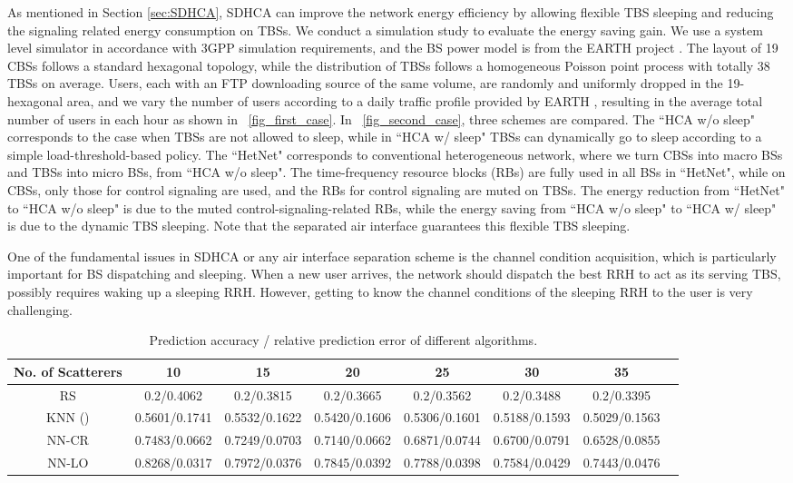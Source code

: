 \documentclass[12pt, draftclsnofoot,onecolumn]{IEEEtran}
\begin{document}
As mentioned in Section \ref{sec:SDHCA}, SDHCA can improve the network energy efficiency by allowing flexible TBS sleeping and reducing the signaling related energy consumption on TBSs. We
conduct a simulation study to evaluate the energy saving gain.  We use a system level simulator in accordance with
3GPP simulation requirements, and the BS power model is from the EARTH project
\cite{Earth}. The layout of 19 CBSs follows a standard hexagonal topology, while
the distribution of TBSs follows a homogeneous Poisson point process with
totally 38 TBSs on average. Users, each with an FTP downloading source of the same volume, are randomly and uniformly dropped in the 19-hexagonal area, and we vary the number of users according to a daily traffic
profile provided by EARTH \cite{Earth}, resulting in the average total number of users in
each hour as shown in \figurename~\ref{fig_first_case}. In \figurename~\ref{fig_second_case}, three schemes are compared. The ``HCA w/o sleep" corresponds to the case when TBSs are not allowed to sleep, while in ``HCA w/ sleep" TBSs can dynamically go to sleep according to a simple load-threshold-based policy. The ``HetNet" corresponds to conventional heterogeneous network, where we turn CBSs into macro BSs and TBSs into micro BSs, from ``HCA w/o sleep". The time-frequency resource blocks (RBs) are fully used in all BSs in ``HetNet", while on CBSs, only those for control signaling are used, and the RBs for control signaling are muted on TBSs. The energy reduction from ``HetNet" to ``HCA w/o sleep" is due to the muted control-signaling-related RBs, while the energy saving from ``HCA w/o sleep" to ``HCA w/ sleep" is due to the dynamic TBS sleeping. Note that the separated air interface guarantees this flexible TBS sleeping.

One of the fundamental issues in SDHCA or any air interface separation scheme is the channel
condition acquisition, which is particularly important for BS dispatching and
sleeping. When a new user arrives, the
network should dispatch the best RRH to act as its serving TBS, possibly
requires waking up a sleeping RRH. However, getting to know the channel
conditions of the sleeping RRH to the user is very challenging.

\begin{table}[!t]
\centering
\caption{Prediction accuracy / relative prediction error of different
algorithms.}
\label{tab:pred}
\begin{tabular}{|c|c|c|c|c|c|c|c|}
\hline
No. of Scatterers & 10 & 15 & 20 & 25 & 30 & 35 \\
\hline
RS & 0.2/0.4062 & 0.2/0.3815 & 0.2/0.3665 & 0.2/0.3562 & 0.2/0.3488 & 0.2/0.3395 \\
\hline
KNN () & 0.5601/0.1741 &	0.5532/0.1622 &	0.5420/0.1606 &	0.5306/0.1601 &	0.5188/0.1593 &	0.5029/0.1563 \\
\hline
NN-CR & 0.7483/0.0662 &	0.7249/0.0703 &	0.7140/0.0662 &	0.6871/0.0744 &	0.6700/0.0791 &	0.6528/0.0855 \\
\hline
NN-LO & 0.8268/0.0317 &	0.7972/0.0376 &	0.7845/0.0392 &	0.7788/0.0398 &	0.7584/0.0429 &	0.7443/0.0476 \\
\hline
\end{tabular}
\end{table}
\end{document}
